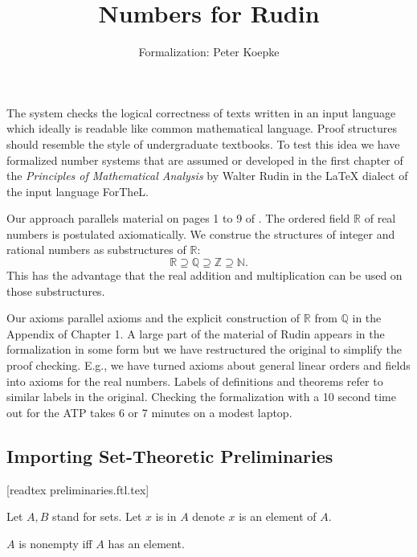 \documentclass{article}
\begin{document}
\title{Numbers for Rudin}

\author{\Naproche{} Formalization: Peter Koepke}

\maketitle

The \Naproche{} system checks the logical correctness of texts
written in an input language which ideally is readable
like common mathematical language. Proof structures should resemble the
style of undergraduate textbooks. To test this
idea we have formalized number systems that are
assumed or developed in the first chapter of the
\textit{Principles of Mathematical Analysis} by Walter Rudin
\cite{Rudin1953} in the {\LaTeX} dialect of the input language ForTheL.

Our approach parallels material
on pages 1 to 9 of \cite{Rudin1953}.
The ordered field $\mathbb{R}$ of real numbers
is postulated axiomatically. We construe the structures of integer and
rational numbers as substructures of $\mathbb{R}$:
\[ \mathbb{R} \supseteq \mathbb{Q} \supseteq \mathbb{Z}
\supseteq \mathbb{N}. \]
This has the advantage that the real addition and multiplication
can be used on those substructures.

Our axioms parallel axioms and the explicit construction of
$\mathbb{R}$ from $\mathbb{Q}$ in the Appendix of Chapter 1.
A large part of the
material of Rudin appears in the formalization in some form but
we have restructured the original to simplify the proof
checking. E.g., we have turned axioms about general
linear orders and fields into axioms for the real numbers.
Labels of definitions and theorems
refer to similar labels in the original.
Checking the formalization
with a 10 second time out for the ATP
takes 6 or 7 minutes on a modest laptop.


\subsection{Importing Set-Theoretic Preliminaries}

\begin{forthel}
[timelimit 10]

[readtex preliminaries.ftl.tex]

Let $A,B$ stand for sets.
Let $x$ is in $A$ denote $x$ is an element of $A$.


\begin{definition}[1 3]
$A$ is nonempty iff $A$ has an element.
\end{definition}

\end{forthel}
\end{document}
